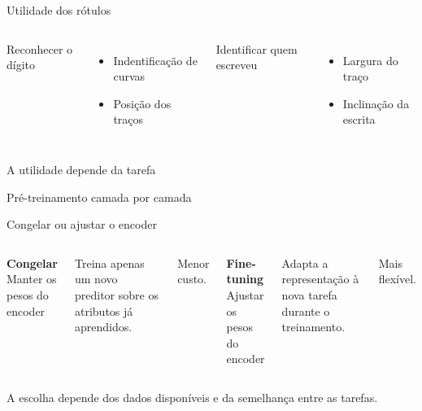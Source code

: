 \documentclass[aspectratio=169,11pt]{beamer}
\newcommand{\painel}[2]{%
  \colorbox{Claro}{\parbox[c][19mm][c]{\dimexpr#1-2\fboxsep\relax}{\centering #2}}%
}
\begin{document}
\begin{frame}[t]{Utilidade dos rótulos}
\vspace{8mm}
\begin{columns}[onlytextwidth,T]
  \painel{\linewidth}{Reconhecer o dígito}
  \smallskip
  \begin{itemize}
    \item Indentificação de curvas
    \item Posição dos traços
  \end{itemize}
  \painel{\linewidth}{Identificar quem escreveu}
  \smallskip
  \begin{itemize}
    \item Largura do traço
    \item Inclinação da escrita
  \end{itemize}
\end{columns}
\vfill
{\centering\large\color{Suave}A utilidade depende da tarefa\par}
\vspace{4mm}
\end{frame}

\begin{frame}[t]{Pré-treinamento camada por camada}
\vfill
\centering
{}
\end{frame}

\begin{frame}[t]{Congelar ou ajustar o encoder}
\smallskip
\begin{columns}[onlytextwidth,T]
  \painel{\linewidth}{\textbf{Congelar}\\Manter os pesos do encoder}
  \smallskip
  {\small Treina apenas um novo preditor sobre os atributos já aprendidos.\par}
  \smallskip
  {\small\color{Suave}Menor custo.\par}
  \painel{\linewidth}{\textbf{Fine-tuning}\\Ajustar os pesos do encoder}
  \smallskip
  {\small Adapta a representação à nova tarefa durante o treinamento.\par}
  \smallskip
  {\small\color{Suave}Mais flexível.\par}
\end{columns}
\vfill
{\centering\small A escolha depende dos dados disponíveis e da semelhança entre as tarefas.\par}
\vfill
\end{frame}
\end{document}

